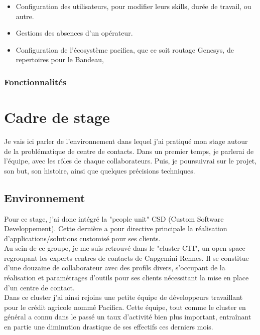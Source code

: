 \documentclass{rapport}
\begin{document}
\begin{itemize}
\item Configuration des utilisateurs, pour modifier leurs skills, durée de travail, ou autre.
\item Gestions des absences d'un opérateur.
\item Configuration de l'écosystème pacifica, que ce soit routage Genesys, de repertoires pour le Bandeau,
\end{itemize}

\subsubsection{Fonctionnalités}

\newpage

\section{Cadre de stage}

Je vais ici parler de l'environnement dans lequel j'ai pratiqué mon stage autour de la problématique de centre de contacts.
Dans un premier temps, je parlerai de l'équipe, avec les rôles de chaque collaborateurs. Puis, je poursuivrai sur le projet, son but, son histoire, ainsi que quelques précisions techniques.

\subsection{Environnement}

Pour ce stage, j'ai donc intégré la "people unit" CSD (Custom Software Developpement). Cette dernière a pour directive principale la réalisation d'applications/solutions customisé pour ses clients.\\

Au sein de ce groupe, je me suis retrouvé dans le "cluster CTI", un open space regroupant les experts centres de contacts de Capgemini Rennes. Il se constitue d'une douzaine de collaborateur avec des profils divers, s'occupant de la réalisation et paramétrages d'outils pour ses clients nécessitant la mise en place d'un centre de contact.\\

Dans ce cluster j'ai ainsi rejoins une petite équipe de développeurs travaillant pour le crédit agricole nommé Pacifica. Cette équipe, tout comme le cluster en général a connu dans le passé un taux d'activité bien plus important, entraînant en partie une diminution drastique de ses effectifs ces derniers mois.
\end{document}
